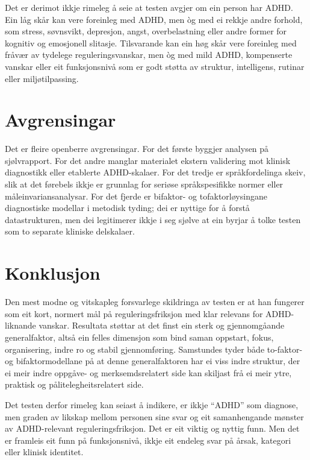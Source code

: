 \documentclass[11pt,a4paper]{article}
\begin{document}
Det er derimot ikkje rimeleg å seie at testen avgjer om ein person har ADHD. Ein låg skår kan vere foreinleg med ADHD, men òg med ei rekkje andre forhold, som stress, søvnsvikt, depresjon, angst, overbelastning eller andre former for kognitiv og emosjonell slitasje. Tilsvarande kan ein høg skår vere foreinleg med fråvær av tydelege reguleringsvanskar, men òg med mild ADHD, kompenserte vanskar eller eit funksjonsnivå som er godt støtta av struktur, intelligens, rutinar eller miljøtilpassing.

\section{Avgrensingar}
Det er fleire openberre avgrensingar. For det første byggjer analysen på sjølvrapport. For det andre manglar materialet ekstern validering mot klinisk diagnostikk eller etablerte ADHD-skalaer. For det tredje er språkfordelinga skeiv, slik at det førebels ikkje er grunnlag for seriøse språkspesifikke normer eller måleinvariansanalysar. For det fjerde er bifaktor- og tofaktorløysingane diagnostiske modellar i metodisk tyding; dei er nyttige for å forstå datastrukturen, men dei legitimerer ikkje i seg sjølve at ein byrjar å tolke testen som to separate kliniske delskalaer.

\section{Konklusjon}
Den mest modne og vitskapleg forsvarlege skildringa av testen er at han fungerer som eit kort, normert mål på reguleringsfriksjon med klar relevans for ADHD-liknande vanskar. Resultata støttar at det finst ein sterk og gjennomgåande generalfaktor, altså ein felles dimensjon som bind saman oppstart, fokus, organisering, indre ro og stabil gjennomføring. Samstundes tyder både to-faktor- og bifaktormodellane på at denne generalfaktoren har ei viss indre struktur, der ei meir indre oppgåve- og merksemdsrelatert side kan skiljast frå ei meir ytre, praktisk og pålitelegheitsrelatert side.

Det testen derfor rimeleg kan seiast å indikere, er ikkje ``ADHD'' som diagnose, men graden av likskap mellom personen sine svar og eit samanhengande mønster av ADHD-relevant reguleringsfriksjon. Det er eit viktig og nyttig funn. Men det er framleis eit funn på funksjonsnivå, ikkje eit endeleg svar på årsak, kategori eller klinisk identitet.

\printbibliography
\end{document}

